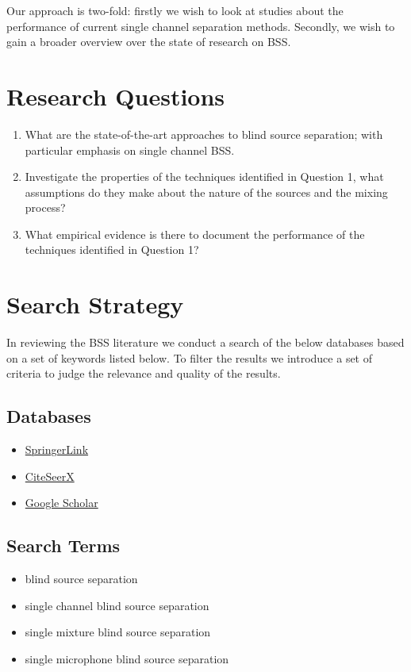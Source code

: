 \documentclass[11pt, oneside, a4paper]{article}
\begin{document}
Our approach is two-fold: firstly we wish to look at studies about the performance of current single channel separation methods. Secondly, we wish to gain a broader overview over the state of research on BSS.


\section{Research Questions}
\begin{enumerate}
  \item What are the state-of-the-art approaches to blind source separation; with particular emphasis on single channel BSS.
  \item Investigate the properties of the techniques identified in Question 1, what assumptions do they make about the nature of the sources and the mixing process?
  \item What empirical evidence is there to document the performance of the techniques identified in Question 1?
\end{enumerate}



\section{Search Strategy}
In reviewing the BSS literature we conduct a search of the below databases based on a set of keywords listed below. To filter the results we introduce a set of criteria to judge the relevance and quality of the results.

\subsection{Databases}

\begin{itemize}
 \item \href{www.springerlink.com}{SpringerLink}
 \item \href {www.citeseerx}{CiteSeerX}
 \item \href{scholar.google.com}{Google Scholar}
\end{itemize}

\subsection{Search Terms}


\begin{itemize}
  \item blind source separation
  \item single channel blind source separation
  \item single mixture blind source separation
  \item single microphone blind source separation
\end{itemize}
\end{document}
